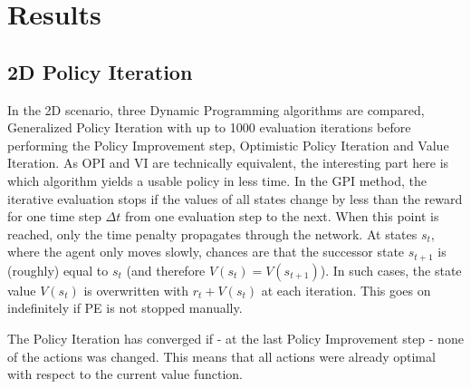 \chapter{Results}
\label{chapter6}

\section{2D Policy Iteration}

In the 2D scenario, three Dynamic Programming algorithms are compared, Generalized Policy Iteration with up to 1000 evaluation iterations before performing the Policy Improvement step, Optimistic Policy Iteration and Value Iteration. As OPI and VI are technically equivalent, the interesting part here is which algorithm yields a usable policy in less time. In the GPI method, the iterative evaluation stops if the values of all states change by less than the reward for one time step $\Delta t$ from one evaluation step to the next. When this point is reached, only the time penalty propagates through the network. At states $s_t$, where the agent only moves slowly, chances are that the successor state $s_{t+1}$ is (roughly) equal to $s_t$ (and therefore $V(s_t)=V(s_{t+1})$). In such cases, the state value $V(s_t)$ is overwritten with $r_t + V(s_t)$ at each iteration. This goes on indefinitely if PE is not stopped manually.

The Policy Iteration has converged if - at the last Policy Improvement step - none of the actions was changed. This means that all actions were already optimal with respect to the current value function. 

\dataOPTI

\dataDP


